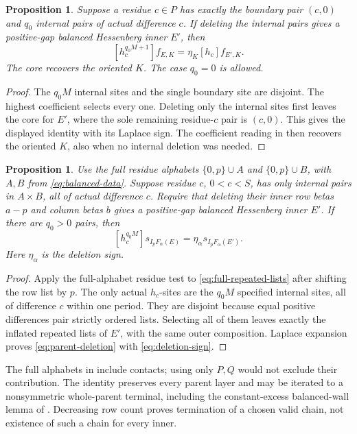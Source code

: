 \documentclass[11pt,a4paper]{amsart}
\numberwithin{equation}{section}
\theoremstyle{plain}
\newtheorem{proposition}[theorem]{Proposition}
\theoremstyle{definition}
\begin{document}
\begin{proposition}\label{prop:mixed-deletion}
Suppose a residue \(c\in P\) has exactly the boundary pair \((c,0)\) and \(q_0\) internal pairs of actual difference \(c\).  If deleting the internal pairs gives a positive-gap balanced Hessenberg inner \(E'\), then
\[
 [h_c^{q_0M+1}]f_{E,K}=\eta_K[h_c]f_{E',K}.
\]
The core recovers the oriented \(K\).  The case \(q_0=0\) is allowed.
\end{proposition}
\begin{proof}
The \(q_0M\) internal sites and the single boundary site are disjoint.  The highest coefficient selects every one.  Deleting only the internal sites first leaves the core for \(E'\), where the sole remaining residue-\(c\) pair is \((c,0)\).  This gives the displayed identity with its Laplace sign.  The coefficient reading in  then recovers the oriented \(K\), also when no internal deletion was needed.
\end{proof}

\begin{proposition}\label{prop:parent-deletion}
Use the full residue alphabets \(\{0,p\}\cup A\) and \(\{0,p\}\cup B\), with \(A,B\) from \eqref{eq:balanced-data}.  Suppose residue \(c\), \(0<c<S\), has only internal pairs in \(A\times B\), all of actual difference \(c\).  Require that deleting their inner row betas \(a-p\) and column betas \(b\) gives a positive-gap balanced Hessenberg inner \(E'\).  If there are \(q_0>0\) pairs, then
\begin{equation}\label{eq:parent-deletion}
 [h_c^{q_0M}]s_{I_pF_\alpha(E)}
 =\eta_\alpha s_{I_pF_\alpha(E')}.
\end{equation}
Here \(\eta_\alpha\) is the deletion sign.
\end{proposition}
\begin{proof}
Apply the full-alphabet residue test to \eqref{eq:full-repeated-lists} after shifting the row list by \(p\).  The only actual \(h_c\)-sites are the \(q_0M\) specified internal sites, all of difference \(c\) within one period.  They are disjoint because equal positive differences pair strictly ordered lists.  Selecting all of them leaves exactly the inflated repeated lists of \(E'\), with the same outer composition.  Laplace expansion proves \eqref{eq:parent-deletion} with \eqref{eq:deletion-sign}.
\end{proof}

The full alphabets in  include contacts; using only \(P,Q\) would not exclude their contribution.  The identity preserves every parent layer and may be iterated to a nonsymmetric whole-parent terminal, including the constant-excess balanced-wall lemma of \cite{Shields2026PowerRigidity}.  Decreasing row count proves termination of a chosen valid chain, not existence of such a chain for every inner.
\end{document}
